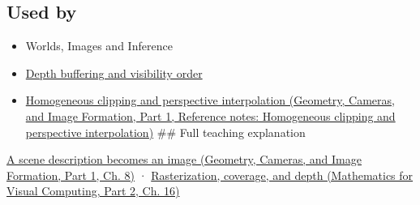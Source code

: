 \subsection{Used by}\label{appendix-ed3f9bc298fe-used-by}

\hypertarget{appendix-ed3f9bc298fe-used-by}{}

\begin{itemize}
\item
  {Worlds, Images and Inference}
\item
  \hyperref[appendix-97578ed97952]{Depth buffering and visibility order}
\item
  \href{../03-Geometry-Cameras-and-Image-Formation-P01/main.pdf\#appendix-40426e4b2103}{Homogeneous clipping and perspective interpolation (Geometry, Cameras, and Image Formation, Part 1, Reference notes: Homogeneous clipping and perspective interpolation)} \#\# Full teaching explanation
\end{itemize}

\href{../03-Geometry-Cameras-and-Image-Formation-P01/main.pdf\#03-visual-computing-i-ch001-a-scene-description-becomes-an-image}{A scene description becomes an image (Geometry, Cameras, and Image Formation, Part 1, Ch. 8)} · \href{../02-Mathematics-for-Visual-Computing-P02/main.pdf\#03-visual-computing-i-ch012-rasterization-coverage-and-depth}{Rasterization, coverage, and depth (Mathematics for Visual Computing, Part 2, Ch. 16)}
